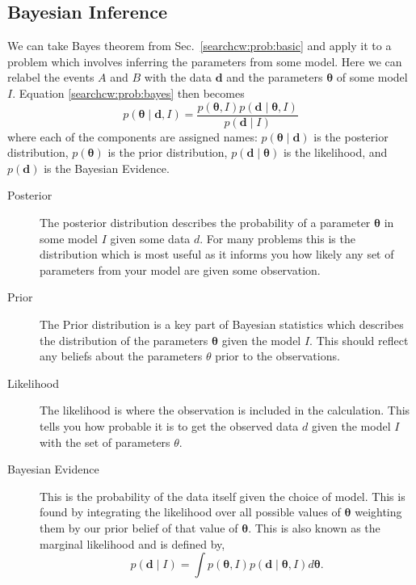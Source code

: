 \subsection{\label{searchcw:bayes}Bayesian Inference}

We can take Bayes theorem from Sec.~\ref{searchcw:prob:basic} and apply it to a
problem which involves inferring the parameters from some model. Here we can
relabel the events $A$ and $B$ with the data ${\bm d}$ and the parameters ${\bm
\theta}$ of some model $I$.  Equation \ref{searchcw:prob:bayes} then becomes
%
\begin{equation}
\label{searchcw:bayes:bayes}
p({\bm \theta} \mid {\bm d}, I) = \frac{p({\bm \theta}, I)p({\bm d} \mid {\bm \theta}, I)}{p({\bm d} \mid I)}
\end{equation}
%
where each of the components are assigned names: $p({\bm \theta} \mid {\bm d})$
is the posterior distribution, $p({\bm \theta})$ is the prior distribution,
$p({\bm d} \mid {\bm \theta})$ is the likelihood, and $p({\bm d})$ is the
Bayesian Evidence.

\begin{description}
	\item [Posterior]
        The posterior distribution describes the probability of a parameter
${\bm \theta}$ in some model $I$ given some data $d$. For many problems this is
the distribution which is most useful as it informs you how likely any set of
parameters from your model are given some observation.
	
        \item [Prior] The Prior distribution is a key part of Bayesian
statistics which describes the distribution of the parameters ${\bm \theta}$ given the model $I$. This should reflect any beliefs about the parameters $\theta$ prior to the observations.
	
        \item [Likelihood] The likelihood is where the observation is included
in the calculation. This tells you how probable it is to get the observed data
$d$ given the model $I$ with the set of parameters $\theta$. 
	
        \item [Bayesian Evidence] This is the probability of the data itself
given the choice of model. This is found by integrating the likelihood over all
possible values of ${\bm \theta}$ weighting them by our prior belief of that
value of ${\bm \theta}$. This is also known as the marginal
likelihood and is defined by,
        \begin{equation} \label{searchcw:bayes:evidence} 
            p({\bm d} \mid I) = \int p({\bm \theta}, I)p({\bm d} \mid {\bm \theta}, I) d{\bm \theta}.
        \end{equation} 
\end{description}

